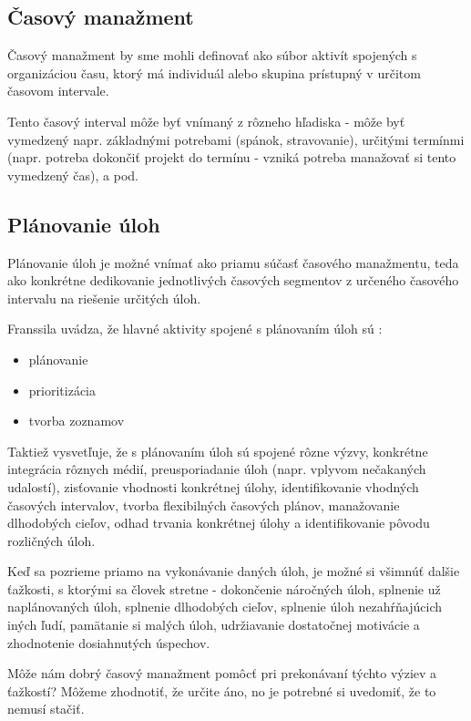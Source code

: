\documentclass[10pt,slovak,a4paper]{article}
\begin{document}
	\subsection{Časový manažment} \label{casovy_manazment}
	
		Časový manažment by sme mohli definovať ako súbor aktivít spojených s organizáciou času, ktorý má individuál alebo skupina prístupný v určitom časovom intervale.
		
		Tento časový interval môže byť vnímaný z rôzneho hľadiska - môže byť vymedzený napr. základnými potrebami (spánok, stravovanie), určitými termínmi (napr. potreba dokončiť projekt do termínu - vzniká potreba manažovať si tento vymedzený čas), a pod.
		
	\subsection{Plánovanie úloh}
	
		Plánovanie úloh je možné vnímať ako priamu súčasť časového manažmentu, teda ako konkrétne dedikovanie jednotlivých časových segmentov z určeného časového intervalu na riešenie určitých úloh.
		
		Franssila uvádza, že hlavné aktivity spojené s plánovaním úloh sú \cite{Franssila}:
		\begin{itemize}
			\item plánovanie
			\item prioritizácia
			\item tvorba zoznamov
		\end{itemize}
		
		Taktiež vysvetľuje, že s plánovaním úloh sú spojené rôzne výzvy, konkrétne integrácia rôznych médií, preusporiadanie úloh (napr. vplyvom nečakaných udalostí), zisťovanie vhodnosti konkrétnej úlohy, identifikovanie vhodných časových intervalov, tvorba flexibilných časových plánov, manažovanie dlhodobých cieľov, odhad trvania konkrétnej úlohy a identifikovanie pôvodu rozličných úloh\cite{Franssila}.
		
		Keď sa pozrieme priamo na vykonávanie daných úloh, je možné si všimnúť dalšie ťažkosti, s ktorými sa človek stretne - dokončenie náročných úloh, splnenie už naplánovaných úloh, splnenie dlhodobých cieľov, splnenie úloh nezahŕňajúcich iných ľudí, pamätanie si malých úloh, udržiavanie dostatočnej motivácie a zhodnotenie dosiahnutých úspechov\cite{Franssila}.
		
		Môže nám dobrý časový manažment pomôcť pri prekonávaní týchto výziev a ťažkostí? Môžeme zhodnotiť, že určite áno, no je potrebné si uvedomiť, že to nemusí stačiť.
		
\end{document}
